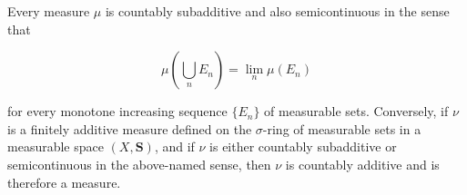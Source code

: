 Every measure $\mu$ is countably subadditive and also semicontinuous in the sense that

$$\mu \left( \bigcup_{n} E_n \right) = \lim_{n} \mu(E_n)$$

for every monotone increasing sequence $\{E_n\}$ of measurable sets. Conversely, if $\nu$ is a finitely additive measure defined on the $\sigma$-ring of measurable sets in a measurable space $(X, \mathbf{S})$, and if $\nu$ is either countably subadditive or semicontinuous in the above-named sense, then $\nu$ is countably additive and is therefore a measure.
